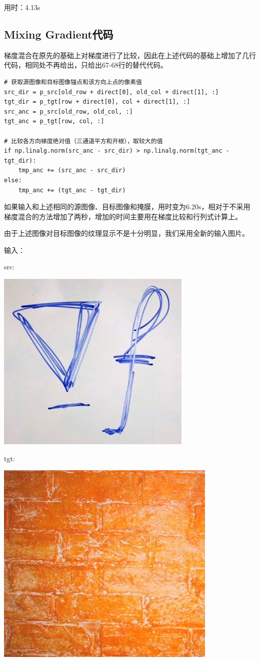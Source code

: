 \documentclass[12pt, a4paper, oneside]{report}
\begin{document}
	\noindent 用时：4.13s
	\subsection{Mixing Gradient代码}
	梯度混合在原先的基础上对梯度进行了比较，因此在上述代码的基础上增加了几行代码，相同处不再给出，只给出67-68行的替代代码。
	\begin{lstlisting}
# 获取源图像和目标图像锚点和该方向上点的像素值
src_dir = p_src[old_row + direct[0], old_col + direct[1], :]
tgt_dir = p_tgt[row + direct[0], col + direct[1], :]
src_anc = p_src[old_row, old_col, :]
tgt_anc = p_tgt[row, col, :]

# 比较各方向梯度绝对值（三通道平方和开根），取较大的值
if np.linalg.norm(src_anc - src_dir) > np.linalg.norm(tgt_anc - tgt_dir):
	tmp_anc += (src_anc - src_dir)
else:
	tmp_anc += (tgt_anc - tgt_dir)
	\end{lstlisting}

	如果输入和上述相同的源图像、目标图像和掩膜，用时变为6.20s，相对于不采用梯度混合的方法增加了两秒，增加的时间主要用在梯度比较和行列式计算上。
	
	由于上述图像对目标图像的纹理显示不是十分明显，我们采用全新的输入图片。
	
	\noindent 输入：
	
	\noindent src: 
	
	\centerline{
		\includegraphics[scale=0.5]{2.jpg}
	}
	
	\noindent tgt: 	
	
	\centerline{	
		\includegraphics[scale=0.5]{1.jpg}
	}
	
\end{document}
